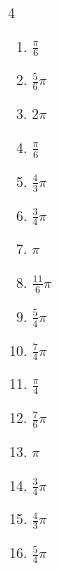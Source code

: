 \begin{multicols}{4}
\begin{enumerate}
  \item $\displaystyle \frac{\pi}{6}$

  \item $\displaystyle \frac{5}{6}\pi$

\columnbreak %

  \item $\displaystyle 2\pi$

  \item $\displaystyle \frac{\pi}{6}$

  \item $\displaystyle \frac{4}{3}\pi$

  \item $\displaystyle \frac{3}{4}\pi$

  \item $\displaystyle \pi$

  \item $\displaystyle \frac{11}{6}\pi$

  \item $\displaystyle \frac{5}{4}\pi$

  \item $\displaystyle \frac{7}{4}\pi$

  \item $\displaystyle \frac{\pi}{4}$

  \item $\displaystyle \frac{7}{6}\pi$

  \item $\displaystyle \pi$

  \item $\displaystyle \frac{3}{4}\pi$

  \item $\displaystyle \frac{4}{3}\pi$

  \item $\displaystyle \frac{5}{4}\pi$


\end{enumerate}
\end{multicols}
